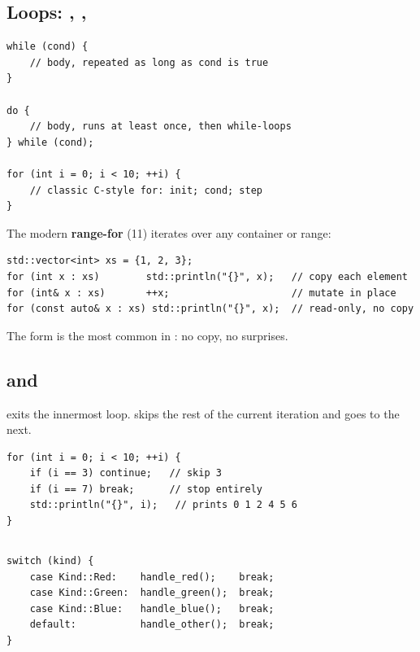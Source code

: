 \subsection{Loops: , , }

\begin{lstlisting}
while (cond) {
    // body, repeated as long as cond is true
}

do {
    // body, runs at least once, then while-loops
} while (cond);

for (int i = 0; i < 10; ++i) {
    // classic C-style for: init; cond; step
}
\end{lstlisting}

The modern \textbf{range-for} (\cpp{}11) iterates over any container
or range:

\begin{lstlisting}
std::vector<int> xs = {1, 2, 3};
for (int x : xs)        std::println("{}", x);   // copy each element
for (int& x : xs)       ++x;                     // mutate in place
for (const auto& x : xs) std::println("{}", x);  // read-only, no copy
\end{lstlisting}

The  form is the most common in \maya{}: no copy,
no surprises.

\subsection{ and }

 exits the innermost loop.  skips the
rest of the current iteration and goes to the next.

\begin{lstlisting}
for (int i = 0; i < 10; ++i) {
    if (i == 3) continue;   // skip 3
    if (i == 7) break;      // stop entirely
    std::println("{}", i);   // prints 0 1 2 4 5 6
}
\end{lstlisting}

\subsection{}

\begin{lstlisting}
switch (kind) {
    case Kind::Red:    handle_red();    break;
    case Kind::Green:  handle_green();  break;
    case Kind::Blue:   handle_blue();   break;
    default:           handle_other();  break;
}
\end{lstlisting}

